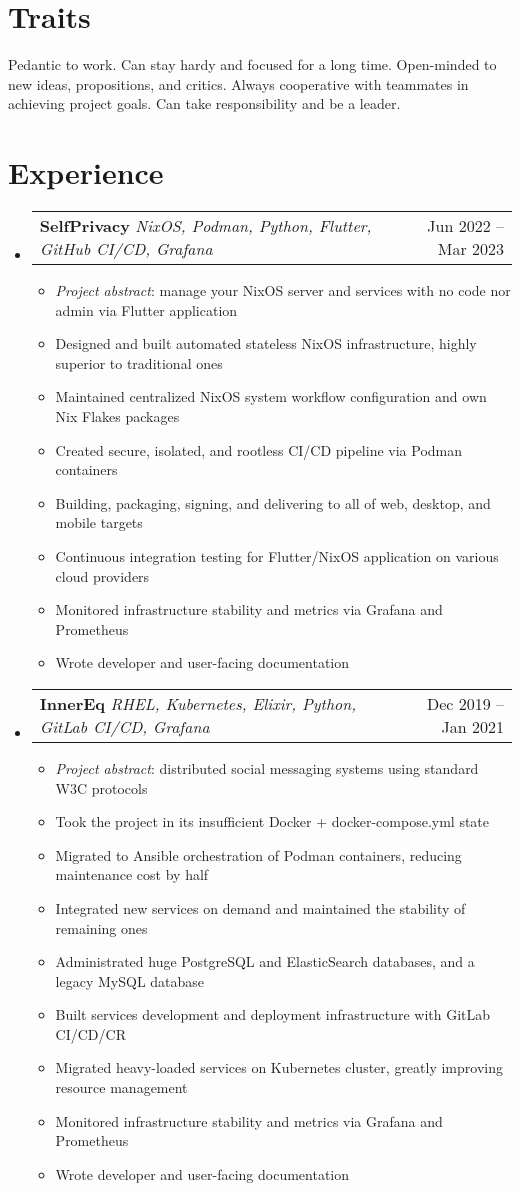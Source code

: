 \documentclass[letterpaper,11pt]{article}
\makeatletter
\newcommand{\resumeItem}[1]{
  \item\small{
    {#1 \vspace{-2pt}}
  }
}
\newcommand{\resumeProjectHeading}[2]{
    \item
    \begin{tabular*}{0.97\textwidth}{l@{\extracolsep{\fill}}r}
      \small#1 & #2 \\
    \end{tabular*}\vspace{-7pt}
}
\newcommand{\resumeSubHeadingListStart}{\begin{itemize}[leftmargin=0.15in, label={}]}
\newcommand{\resumeSubHeadingListEnd}{\end{itemize}}
\newcommand{\resumeItemListStart}{\begin{itemize}}
\newcommand{\resumeItemListEnd}{\end{itemize}\vspace{-5pt}}
\makeatother
\begin{document}
\section{Traits}
 \begin{itemize}[leftmargin=0.15in, label={}]
    \small{\item{
      Pedantic to work. Can stay hardy and focused for a long time. Open-minded to new ideas, propositions, and critics. Always cooperative with teammates in achieving project goals. Can take responsibility and be a leader.
    }}
 \end{itemize}

\section{Experience}
    \resumeSubHeadingListStart
      \resumeProjectHeading
          {\textbf{SelfPrivacy} \emph{NixOS, Podman, Python, Flutter, GitHub CI/CD, Grafana}}{Jun 2022 -- Mar 2023 }
          \resumeItemListStart
            \resumeItem{\emph{Project abstract}: manage your NixOS server and services with no code nor admin via Flutter application}
            \resumeItem{Designed and built automated stateless NixOS infrastructure, highly superior to traditional ones}
            \resumeItem{Maintained centralized NixOS system workflow configuration and own Nix Flakes packages}
            \resumeItem{Created secure, isolated, and rootless CI/CD pipeline via Podman containers}
            \resumeItem{Building, packaging, signing, and delivering to all of web, desktop, and mobile targets}
            \resumeItem{Continuous integration testing for Flutter/NixOS application on various cloud providers}
            \resumeItem{Monitored infrastructure stability and metrics via Grafana and Prometheus}
            \resumeItem{Wrote developer and user-facing documentation}
          \resumeItemListEnd
      \resumeProjectHeading
          {\textbf{InnerEq} \emph{RHEL, Kubernetes, Elixir, Python, GitLab CI/CD, Grafana}}{Dec 2019 -- Jan 2021}
          \resumeItemListStart
            \resumeItem{\emph{Project abstract}: distributed social messaging systems using standard W3C protocols}
            \resumeItem{Took the project in its insufficient Docker + docker-compose.yml state}
            \resumeItem{Migrated to Ansible orchestration of Podman containers, reducing maintenance cost by half}
            \resumeItem{Integrated new services on demand and maintained the stability of remaining ones}
            \resumeItem{Administrated huge PostgreSQL and ElasticSearch databases, and a legacy MySQL database}
            \resumeItem{Built services development and deployment infrastructure with GitLab CI/CD/CR}
            \resumeItem{Migrated heavy-loaded services on Kubernetes cluster, greatly improving resource management}
            \resumeItem{Monitored infrastructure stability and metrics via Grafana and Prometheus}
            \resumeItem{Wrote developer and user-facing documentation}
          \resumeItemListEnd
    \resumeSubHeadingListEnd

\end{document}
